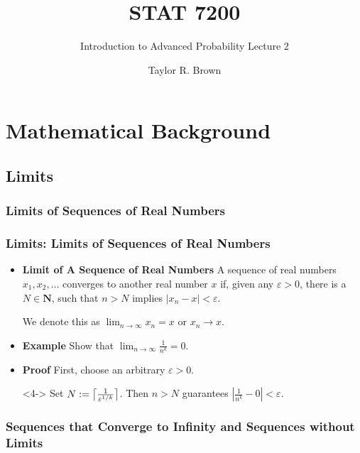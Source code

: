 \documentclass[handout]{beamer}
\title{STAT 7200}
\subtitle{Introduction to Advanced Probability \newline Lecture 2}
\author{Taylor R. Brown}
\institute{}
\date{}
\DeclarePairedDelimiter{\ceil}{\lceil}{\rceil}
\begin{document}
\frame{\titlepage}

\section[Outline]{}



\section{Mathematical Background}


\subsection{Limits}
\subsubsection{Limits of Sequences of Real Numbers}

\frame
{
  \frametitle{Limits: Limits of Sequences of Real Numbers}

  \begin{itemize}
  \item <1->  \textbf{Limit of A Sequence of Real Numbers} A sequence of real numbers $x_1,x_2,\ldots $ converges to another real number $x$ if, given any $\varepsilon>0$, there is a $N\in\mathbf{N}$, such that $n>N$ implies $|x_n-x|<\varepsilon$. 
  
  We denote this as $\lim_{n\rightarrow\infty} x_n=x$ or $x_n \to x$.
 
  
      \item<2-> \textbf{Example} Show that $\lim_{n\rightarrow\infty}  \frac{1}{n^k}= 0.$

    \item<3-> \textbf{Proof} First, choose an arbitrary $\varepsilon>0$.     
    \item[]<4-> Set $N := \ceil[\big]{\frac{1}{\varepsilon^{1/k}}}$. Then $n > N$ guarantees  $|\frac{1}{n^k}-0|<\varepsilon$. 
    
    
  \end{itemize}
}

\subsubsection{Sequences that Converge to Infinity and Sequences without Limits}
\end{document}
